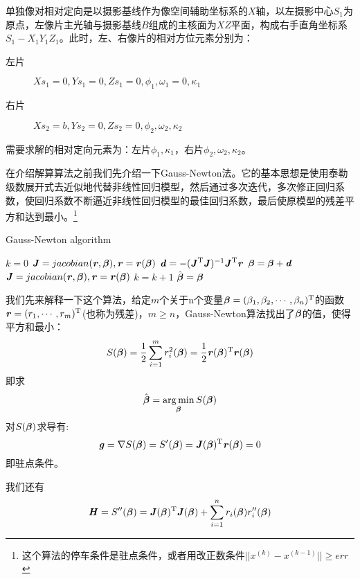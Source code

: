 单独像对相对定向是以摄影基线作为像空间辅助坐标系的$X$轴，以左摄影中心$S_1$为原点，左像片主光轴与摄影基线$B$组成的主核面为$XZ$平面，构成右手直角坐标系$S_1-X_1Y_1Z_1$。此时，左、右像片的相对方位元素分别为：
\begin{description}
\item[左片] $Xs_1=0,Ys_1=0,Zs_1=0,\phi_1,\omega_1=0,\kappa_1$
\item[右片] $Xs_2=b,Ys_2=0,Zs_2=0,\phi_2,\omega_2,\kappa_2$
\end{description}
需要求解的相对定向元素为：左片$\phi_1,\kappa_1$，右片$\phi_2,\omega_2,\kappa_2$。

在介绍解算算法之前我们先介绍一下Gauss-Newton法。它的基本思想是使用泰勒级数展开式去近似地代替非线性回归模型，然后通过多次迭代，多次修正回归系数，使回归系数不断逼近非线性回归模型的最佳回归系数，最后使原模型的残差平方和达到最小。\footnote{这个算法的停车条件是驻点条件，或者用改正数条件$||x^{(k)}-x^{(k-1)}||\ge err$}

\begin{algorithm}[htbp]
\caption{Gauss-Newton algorithm}
\begin{algorithmic}[1]
\State $k=0$
\State $\MJ=jacobian(\Vr,\Vbeta),\Vr=\Vr(\Vbeta)$
\State $\Vd=-(\MJ\myt\MJ)^{-1}\MJ\myt\Vr$
\State $\Vbeta=\Vbeta+\Vd$
\State $\MJ=jacobian(\Vr,\Vbeta),\Vr=\Vr(\Vbeta)$
\State $k=k+1$
\EndWhile
\State $\hat\Vbeta=\Vbeta$
\end{algorithmic}
\end{algorithm}

我们先来解释一下这个算法，给定$m$个关于n个变量$\Vbeta=(\beta_1,\beta_2,\cdots,\beta_n)\myt$的函数$\Vr=(r_1,\cdots,r_m)\myt$(也称为残差)，$m\ge n$，Gauss-Newton算法找出了$\Vbeta$的值，使得平方和最小：
\begin{equation}
S(\Vbeta)=\frac{1}{2}\sum_{i=1}^mr_i^2(\Vbeta)=\frac{1}{2}\Vr(\Vbeta)\myt\Vr(\Vbeta)
\end{equation}
即求
\begin{equation}
\hat\Vbeta=\mathop{\arg\min}_{\Vbeta}S(\Vbeta)
\end{equation}
对$S(\Vbeta)$求导有:
\begin{equation}
\Vg=\nabla S(\Vbeta)=S'(\Vbeta)=\MJ(\Vbeta)\myt\Vr(\Vbeta)=0
\end{equation}
即驻点条件。

我们还有
\begin{equation}
\MH=S''(\Vbeta)=\MJ(\Vbeta)\myt\MJ(\Vbeta)+\sum_{i=1}^nr_i(\Vbeta)r''_i(\Vbeta)
\end{equation}

